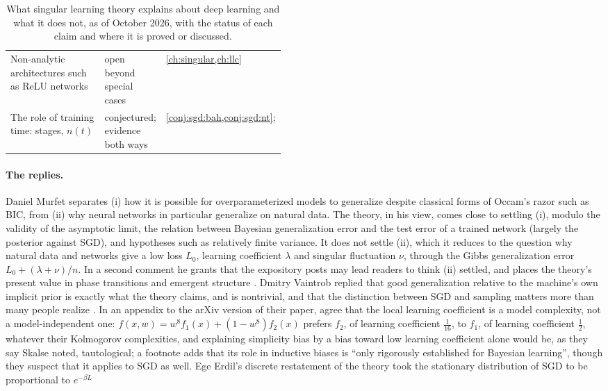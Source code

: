 \begin{refsection}
\begin{table}[t]
\begin{fullwidth}
\begin{tabularx}{\linewidth}{@{}>{\raggedright\arraybackslash}X>{\raggedright\arraybackslash}p{0.21\linewidth}>{\raggedright\arraybackslash}p{0.25\linewidth}@{}}
Non-analytic architectures such as ReLU networks & open beyond special cases & \cref{ch:singular,ch:llc}\\
The role of training time: stages, $n(t)$ & conjectured; evidence both ways & \cref{conj:sgd:bah,conj:sgd:nt}; \textcite{CarrollEtAl2025}\\
\bottomrule
\end{tabularx}
\end{fullwidth}
\caption{What singular learning theory explains about deep learning and what it does not, as of October 2026, with the status of each claim and where it is proved or discussed.}\label{tab:sgd:explains}
\end{table}

\paragraph{The replies.} Daniel Murfet \parencite{Murfet2023a} separates (i) how it is possible for overparameterized models to generalize despite classical forms of Occam's razor such as BIC, from (ii) why neural networks in particular generalize on natural data. The theory, in his view, comes close to settling (i), modulo the validity of the asymptotic limit, the relation between Bayesian generalization error and the test error of a trained network (largely the posterior against SGD), and hypotheses such as relatively finite variance. It does not settle (ii), which it reduces to the question why natural data and networks give a low loss $L_0$, learning coefficient $\lambda$ and singular fluctuation $\nu$, through the Gibbs generalization error $L_0+(\lambda+\nu)/n$. In a second comment he grants that the expository posts may lead readers to think (ii) settled, and places the theory's present value in phase transitions and emergent structure \parencite{Murfet2023c}. Dmitry Vaintrob replied that good generalization relative to the machine's own implicit prior is exactly what the theory claims, and is nontrivial, and that the distinction between SGD and sampling matters more than many people realize \parencite{Vaintrob2023}. In an appendix to the arXiv version of their paper, \textcite[Appendix~F]{LauEtAl2025} agree that the local learning coefficient is a model complexity, not a model-independent one: $f(x,w)=w^8f_1(x)+(1-w^8)f_2(x)$ prefers $f_2$, of learning coefficient $\frac1{16}$, to $f_1$, of learning coefficient $\frac12$, whatever their Kolmogorov complexities, and explaining simplicity bias by a bias toward low learning coefficient alone would be, as they say Skalse noted, tautological; a footnote adds that its role in inductive biases is ``only rigorously established for Bayesian learning'', though they suspect that it applies to SGD as well. Ege Erdil's discrete restatement of the theory took the stationary distribution of SGD to be proportional to $e^{-\beta L}$ 
\end{refsection}
